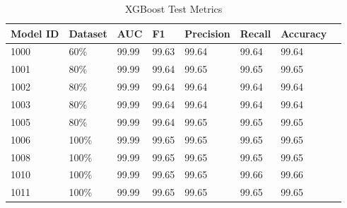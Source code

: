 \begin{table}[h]
\centering
\caption{XGBoost Test Metrics}
\label{tab:xgb-test-metrics}
\begin{tabular}{|l|l|l|l|l|l|l|l|}
\hline
\textbf{Model ID} & \textbf{Dataset} & \textbf{AUC} & \textbf{F1} & \textbf{Precision} & \textbf{Recall} & \textbf{Accuracy}  \\ \hline
1000 & 60\% & 99.99 & 99.63 & 99.64 & 99.64 & 99.64 \\ \hline
1001 & 80\% & 99.99 & 99.64 & 99.65 & 99.65 & 99.65 \\ \hline
1002 & 80\% & 99.99 & 99.64 & 99.64 & 99.64 & 99.64 \\ \hline
1003 & 80\% & 99.99 & 99.64 & 99.64 & 99.64 & 99.64 \\ \hline
1005 & 80\% & 99.99 & 99.64 & 99.65 & 99.65 & 99.65 \\ \hline
1006 & 100\% & 99.99 & 99.65 & 99.65 & 99.65 & 99.65 \\ \hline
1008 & 100\% & 99.99 & 99.65 & 99.65 & 99.65 & 99.65 \\ \hline
1010 & 100\% & 99.99 & 99.65 & 99.65 & 99.66 & 99.66 \\ \hline
1011 & 100\% & 99.99 & 99.65 & 99.65 & 99.65 & 99.65 \\ \hline
\end{tabular}
\end{table}



